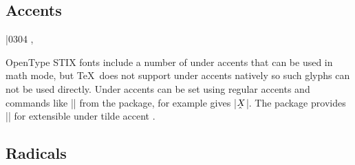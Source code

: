  \subsection{Accents}
 \begin{multicols}{2}
 \showaccent{}
 \showaccent{}
 \showaccent{}
 \showaccent{}
 \showaccent\bar{0304}{}
 \showaccent{}
 \showaccent{}
 \showaccent{}
 \showaccent{}
 \showaccent{}
 \showaccent{}
 \showaccent{}
 \showaccent{}
 \showaccent{}
 \showaccent{}
 \showaccent{}
 \showaccent{}
 \showaccent{}, \cmd\rightarrowaccent
 \showaccent{}
 \showaccent{}
 \showaccent{}
 \showaccent{}
 \showaccent{}
 \end{multicols}

 \begin{multicols}{2}
 \showwideaccent{}
 \showwideaccent{}
 \showwideaccent{}
 \showwideaccent{}
 \showwideaccent{}
 \showwideaccent{}
 \showwideaccent{}
 \showwideaccent{}
 \end{multicols}

 OpenType STIX fonts include a number of under accents that can be used in
 math mode, but \TeX\ does not support under accents natively so such glyphs
 can not be used directly. Under accents can be set using regular accents and
 commands like |\underaccent| from the  package, for example
 gives |\(\underaccent{\hat}{X}\)|. The
  package provides |\utilde| for extensible under tilde
 accent \citep{undertilde}.
 
 
 \begin{multicols}{2}
 \showover{}
 \showover{}
 \showover{} %
 \showover{}
 \showover{}
 \end{multicols}

 \subsection{Radicals}
 \begin{multicols}{2}
 \showaccent{}
 \showaccent{}
 \end{multicols}
 
 
 
 
 
 